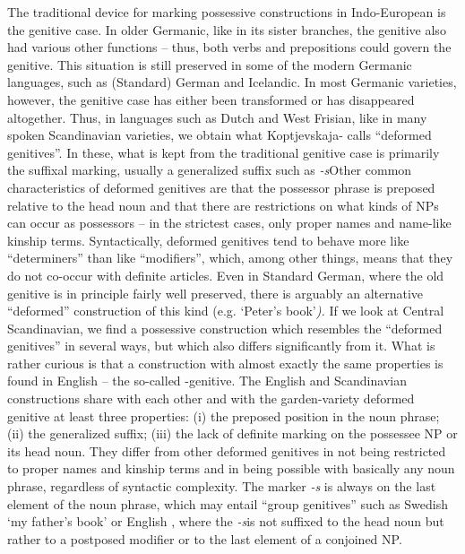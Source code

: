 The traditional device for marking possessive constructions in Indo-European is the genitive case. In older Germanic, like in its sister branches, the genitive also had various other functions – thus, both verbs and prepositions could govern the genitive. This situation is still preserved in some of the modern Germanic languages, such as (Standard) German and Icelandic. In most Germanic varieties, however, the genitive case has either been transformed or has disappeared altogether. Thus, in languages such as Dutch and West Frisian, like in many spoken Scandinavian varieties, we obtain what Koptjevskaja-\citet{Tamm2003} calls “deformed genitives”. In these, what is kept from the traditional genitive case is primarily the suffixal marking, usually a generalized suffix such as\textit{ {}-s}Other common characteristics of deformed genitives are that the possessor phrase is preposed relative to the head noun and that there are restrictions on what kinds of NPs can occur as possessors – in the strictest cases, only proper names and name-like kinship terms. Syntactically, deformed genitives tend to behave more like “determiners” than like “modifiers”, which, among other things, means that they do not co-occur with definite articles. Even in Standard German, where the old genitive is in principle fairly well preserved, there is arguably an alternative “deformed” construction of this kind (e.g. ‘Peter’s book’\textit{).} If we look at Central Scandinavian, we find a possessive construction which resembles the “deformed genitives” in several ways, but which also differs significantly from it. What is rather curious is that a construction with almost exactly the same properties is found in English – the so-called -genitive. The English and Scandinavian constructions share with each other and with the garden-variety deformed genitive at least three properties: (i) the preposed position in the noun phrase; (ii) the generalized suffix; (iii) the lack of definite marking on the possessee NP or its head noun. They differ from other deformed genitives in not being restricted to proper names and kinship terms and in being possible with basically any noun phrase, regardless of syntactic complexity. The marker\textit{ {}-s} is always on the last element of the noun phrase, which may entail “group genitives” such as Swedish  ‘my father’s book’ or English , where the\textit{ {}-s}\textstyleLinguisticExample{ }is not suffixed to the head noun but rather to a postposed modifier or to the last element of a conjoined NP. 

